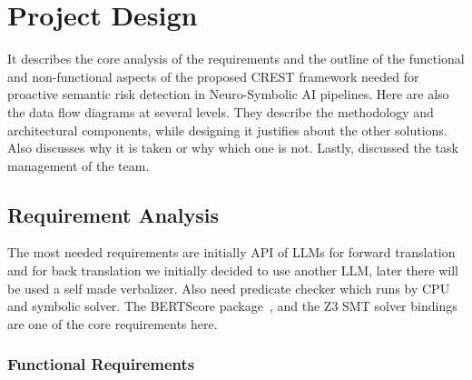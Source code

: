 \chapter{Project Design}

It describes the core analysis of the requirements and the outline of the functional and non-functional aspects of the proposed CREST framework needed for proactive semantic risk detection in Neuro-Symbolic AI pipelines. Here are also the data flow diagrams at several levels. They describe the methodology and architectural components, while designing it justifies about the other solutions. Also discusses why it is taken or why which one is not. Lastly, discussed the task management of the team.  

\section{Requirement Analysis}

The most needed requirements are initially API of LLMs for forward translation and for back translation we initially decided to use another LLM, later there will be used a self made verbalizer. Also need predicate checker which runs by CPU and symbolic solver. The BERTScore package~\cite{zhang2020bertscore}, and the Z3 SMT solver bindings~\cite{demoura2008z3} are one of the core requirements here.

\subsection{Functional Requirements}

